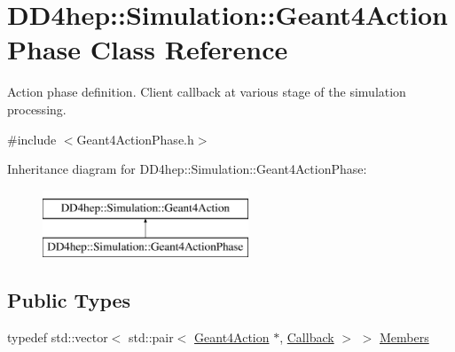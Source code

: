 \hypertarget{class_d_d4hep_1_1_simulation_1_1_geant4_action_phase}{}\section{D\+D4hep\+:\+:Simulation\+:\+:Geant4\+Action\+Phase Class Reference}
\label{class_d_d4hep_1_1_simulation_1_1_geant4_action_phase}


Action phase definition. Client callback at various stage of the simulation processing.  




{\ttfamily \#include $<$Geant4\+Action\+Phase.\+h$>$}

Inheritance diagram for D\+D4hep\+:\+:Simulation\+:\+:Geant4\+Action\+Phase\+:\begin{figure}[H]
\begin{center}
\leavevmode
\includegraphics[height=2.000000cm]{class_d_d4hep_1_1_simulation_1_1_geant4_action_phase}
\end{center}
\end{figure}
\subsection*{Public Types}
\begin{DoxyCompactItemize}
\item 
typedef std\+::vector$<$ std\+::pair$<$ \hyperlink{class_d_d4hep_1_1_simulation_1_1_geant4_action}{Geant4\+Action} $\ast$, \hyperlink{class_d_d4hep_1_1_callback}{Callback} $>$ $>$ \hyperlink{class_d_d4hep_1_1_simulation_1_1_geant4_action_phase_a4df9a501a5c2d810603cd58f5ff5157d}{Members}
\end{DoxyCompactItemize}
